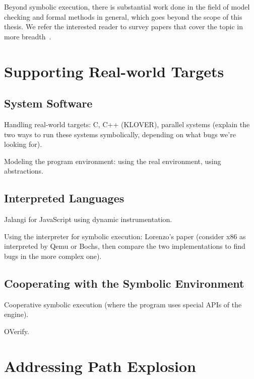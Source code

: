 Beyond symbolic execution, there is substantial work done in the field of model checking and formal methods in general, which goes beyond the scope of this thesis.  We refer the interested reader to survey papers that cover the topic in more breadth~\cite{jhala2009software, woodcock2009formal}.


\section{Supporting Real-world Targets}
\label{sec:relwork:targets}

\subsection{System Software}

Handling real-world targets: C, C++ (KLOVER), parallel systems (explain the two ways to run these systems symbolically, depending on what bugs we're looking for).

Modeling the program environment: using the real environment, using abstractions.

\subsection{Interpreted Languages}

Jalangi for JavaScript using dynamic instrumentation.

Using the interpreter for symbolic execution: Lorenzo's paper (consider x86 as interpreted by Qemu or Bochs, then compare the two implementations to find bugs in the more complex one).

\subsection{Cooperating with the Symbolic Environment}

Cooperative symbolic execution (where the program uses special APIs of the engine).

OVerify.


\section{Addressing Path Explosion}
\label{sec:relwork:pathexpl}

